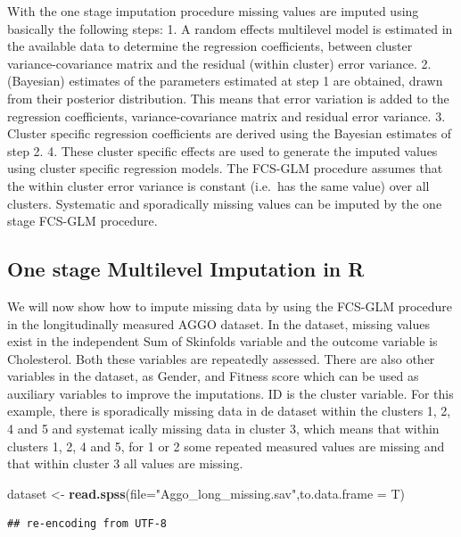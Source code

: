 \documentclass[]{book}
\newenvironment{Shaded}{\begin{snugshade}}{\end{snugshade}}
\newcommand{\KeywordTok}[1]{\textcolor[rgb]{0.13,0.29,0.53}{\textbf{#1}}}
\newcommand{\DataTypeTok}[1]{\textcolor[rgb]{0.13,0.29,0.53}{#1}}
\newcommand{\StringTok}[1]{\textcolor[rgb]{0.31,0.60,0.02}{#1}}
\newcommand{\NormalTok}[1]{#1}
\theoremstyle{definition}
\theoremstyle{definition}
\theoremstyle{definition}
\theoremstyle{remark}
\begin{document}
With the one stage imputation procedure missing values are imputed using
basically the following steps: 1. A random effects multilevel model is
estimated in the available data to determine the regression
coefficients, between cluster variance-covariance matrix and the
residual (within cluster) error variance. 2. (Bayesian) estimates of the
parameters estimated at step 1 are obtained, drawn from their posterior
distribution. This means that error variation is added to the regression
coefficients, variance-covariance matrix and residual error variance. 3.
Cluster specific regression coefficients are derived using the Bayesian
estimates of step 2. 4. These cluster specific effects are used to
generate the imputed values using cluster specific regression models.
The FCS-GLM procedure assumes that the within cluster error variance is
constant (i.e.~has the same value) over all clusters. Systematic and
sporadically missing values can be imputed by the one stage FCS-GLM
procedure.

\subsection{One stage Multilevel Imputation in
R}\label{one-stage-multilevel-imputation-in-r-1}

We will now show how to impute missing data by using the FCS-GLM
procedure in the longitudinally measured AGGO dataset. In the dataset,
missing values exist in the independent Sum of Skinfolds variable and
the outcome variable is Cholesterol. Both these variables are repeatedly
assessed. There are also other variables in the dataset, as Gender, and
Fitness score which can be used as auxiliary variables to improve the
imputations. ID is the cluster variable. For this example, there is
sporadically missing data in de dataset within the clusters 1, 2, 4 and
5 and systemat ically missing data in cluster 3, which means that within
clusters 1, 2, 4 and 5, for 1 or 2 some repeated measured values are
missing and that within cluster 3 all values are missing.

\begin{Shaded}
\begin{Highlighting}[]
\NormalTok{dataset <-}\StringTok{ }\KeywordTok{read.spss}\NormalTok{(}\DataTypeTok{file=}\StringTok{"Aggo_long_missing.sav"}\NormalTok{,}\DataTypeTok{to.data.frame =}\NormalTok{ T)}
\end{Highlighting}
\end{Shaded}

\begin{verbatim}
## re-encoding from UTF-8
\end{verbatim}
\end{document}
